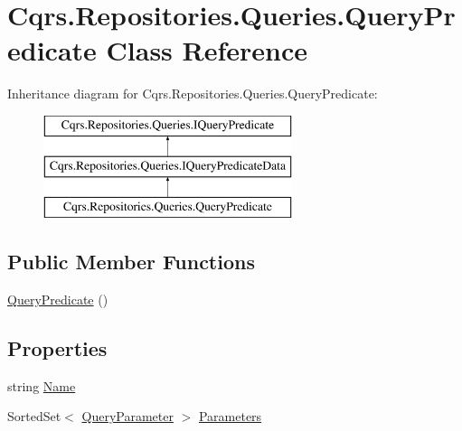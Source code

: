 \hypertarget{classCqrs_1_1Repositories_1_1Queries_1_1QueryPredicate}{}\section{Cqrs.\+Repositories.\+Queries.\+Query\+Predicate Class Reference}
\label{classCqrs_1_1Repositories_1_1Queries_1_1QueryPredicate}
Inheritance diagram for Cqrs.\+Repositories.\+Queries.\+Query\+Predicate\+:\begin{figure}[H]
\begin{center}
\leavevmode
\includegraphics[height=3.000000cm]{classCqrs_1_1Repositories_1_1Queries_1_1QueryPredicate}
\end{center}
\end{figure}
\subsection*{Public Member Functions}
\begin{DoxyCompactItemize}
\item 
\hyperlink{classCqrs_1_1Repositories_1_1Queries_1_1QueryPredicate_ab690c78e98470fe4e219380db1c0e52c}{Query\+Predicate} ()
\end{DoxyCompactItemize}
\subsection*{Properties}
\begin{DoxyCompactItemize}
\item 
string \hyperlink{classCqrs_1_1Repositories_1_1Queries_1_1QueryPredicate_a39ade65d87e51fcf9abf8e79cb5d62df}{Name}
\item 
Sorted\+Set$<$ \hyperlink{classCqrs_1_1Repositories_1_1Queries_1_1QueryParameter}{Query\+Parameter} $>$ \hyperlink{classCqrs_1_1Repositories_1_1Queries_1_1QueryPredicate_abc33bd25e43bcef2a084cde97bc478e6}{Parameters}
\end{DoxyCompactItemize}



